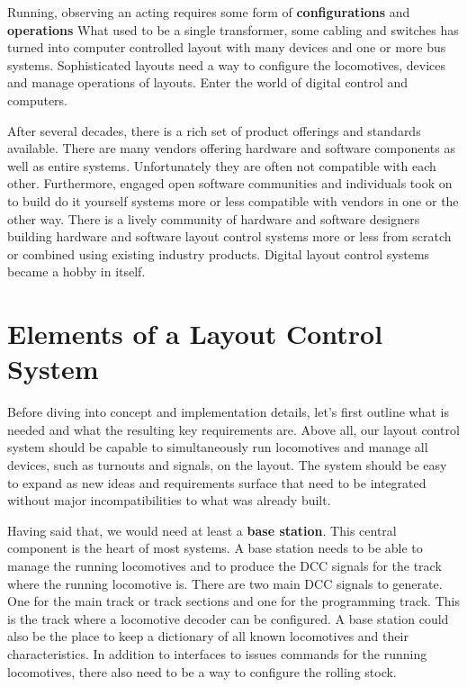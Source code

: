 Running, observing an acting requires some form of {\bf configurations} and {\bf operations} What used to be a single transformer, some cabling and switches has turned into computer controlled layout with many devices and one or more bus systems. Sophisticated layouts need a way to configure the locomotives, devices and manage operations of layouts. Enter the world of digital control and computers.

After several decades, there is a rich set of product offerings and standards available. There are many vendors offering hardware and software components as well as entire systems. Unfortunately they are often not compatible with each other. Furthermore, engaged open software communities and individuals took on to build do it yourself systems more or less compatible with vendors in one or the other way. There is a lively community of hardware and software designers building hardware and software layout control systems more or less from scratch or combined using existing industry products. Digital layout control systems became a hobby in itself.

\section*{Elements of a Layout Control System}

Before diving into concept and implementation details, let's first outline what is needed and what the resulting key requirements are. Above all, our layout control system should be capable to simultaneously run locomotives and manage all devices, such as turnouts and signals, on the layout. The system should be easy to expand as new ideas and requirements surface that need to be integrated without major incompatibilities to what was already built.

Having said that, we would need at least a {\bf base station}. This central component is the heart of most systems. A base station needs to be able to manage the running locomotives and to produce the DCC signals for the track where the running locomotive is. There are two main DCC signals to generate. One for the main track or track sections and one for the programming track. This is the track where a locomotive decoder can be configured. A base station could also be the place to keep a dictionary of all known locomotives and their characteristics. In addition to interfaces to issues commands for the running locomotives, there also need to be a way to configure the rolling stock.

